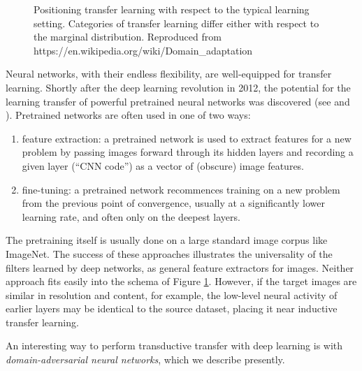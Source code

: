 \begin{figure}
\caption{Positioning transfer learning with respect to the typical learning setting. Categories of transfer learning differ either with respect to the marginal distribution. Reproduced from https://en.wikipedia.org/wiki/Domain\_adaptation}
\label{fig:transfer_modes}
\end{figure}

Neural networks, with their endless flexibility, are well-equipped for transfer learning. Shortly after the deep learning revolution in 2012, the potential for the learning transfer of powerful pretrained neural networks was discovered (see \cite{zeiler2014visualizing} and \cite{sharif2014cnn}). Pretrained networks are often used in one of two ways:

\begin{enumerate}
\item feature extraction: a pretrained network is used to extract features for a new problem by passing images forward through its hidden layers and recording a given layer (``CNN code'') as a vector of (obscure) image features.
\item fine-tuning: a pretrained network recommences training on a new problem from the previous point of convergence, usually at a significantly lower learning rate, and often only on the deepest layers.
\end{enumerate}

The pretraining itself is usually done on a large standard image corpus like ImageNet. The success of these approaches illustrates the universality of the filters learned by deep networks, as general feature extractors for images. Neither approach fits easily into the schema of Figure \ref{fig:transfer_modes}. However, if the target images are similar in resolution and content, for example, the low-level neural activity of earlier layers may be identical to the source dataset, placing it near inductive transfer learning.

An interesting way to perform transductive transfer with deep learning is with \emph{domain-adversarial neural networks}, which we describe presently.

